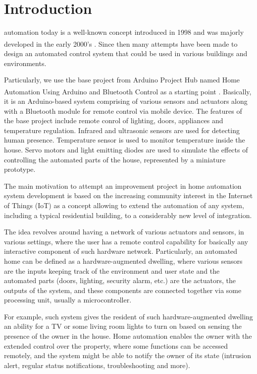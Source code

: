 \documentclass[journal,onecolumn]{IEEEtran}
\begin{document}
\section{Introduction}

 automation today is a well-known concept introduced in 1998 and was majorly developed in the early 2000’s \textsuperscript{\cite{IEEEhowto:Hendricks}}. Since then many attempts have been made to design an automated control system that could be used in various buildings and environments.

Particularly, we use the base project from Arduino Project Hub named Home Automation Using Arduino and Bluetooth Control as a starting point \textsuperscript{\cite{IEEEhowto:Kumar}}. Basically, it is an Arduino-based system comprising of various sensors and actuators along with a Bluetooth module for remote control via mobile device. The features of the base project include remote conrol of lighting, doors, appliances and temperature regulation. Infrared and ultrasonic sensors are used for detecting human presence. Temperature sensor is used to monitor temperature inside the house. Servo motors and light emitting diodes are used to simulate the effects of controlling the automated parts of the house, represented by a miniature prototype.

The main motivation to attempt an improvement project in home automation system development is based on the increasing community interest in the Internet of Things (IoT) as a concept allowing to extend the automation of any system, including a typical residential building, to a considerably new level of integration.

The idea revolves around having a network of various actuators and sensors, in various settings, where the user has a remote control capability for basically any interactive component of such hardware network. Particularly, an automated home can be defined as a hardware-augmented dwelling, where various sensors are the inputs keeping track of the environment and user state and the automated parts (doors, lighting, security alarm, etc.) are the actuators, the outputs of the system, and these components are connected together via some processing unit, usually a microcontroller.

For example, such system gives the resident of such hardware-augmented dwelling an ability for a TV or some living room lights to turn on based on sensing the presence of the owner in the house. Home automation enables the owner with the extended control over the property, where some functions can be accessed remotely, and the system might be able to notify the owner of its state (intrusion alert, regular status notifications, troubleshooting and more). 
\end{document}
